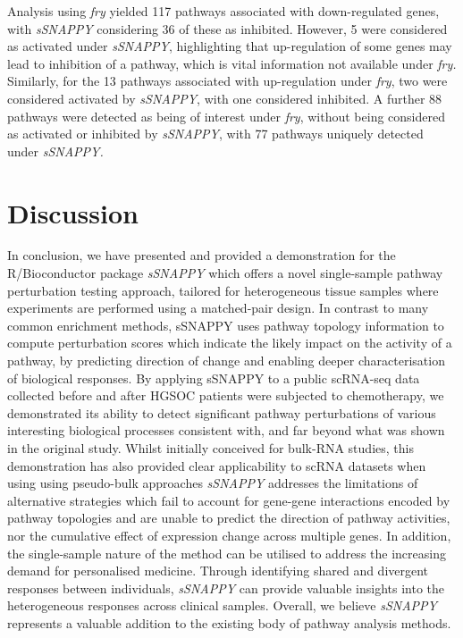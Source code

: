 \documentclass[9pt,a4paper,]{extarticle}
\begin{document}
Analysis using \emph{fry} yielded 117 pathways associated with down-regulated genes, with \emph{sSNAPPY} considering 36 of these as inhibited.
However, 5 were considered as activated under \emph{sSNAPPY}, highlighting that up-regulation of some genes may lead to inhibition of a pathway, which is vital information not available under \emph{fry.}
Similarly, for the 13 pathways associated with up-regulation under \emph{fry}, two were considered activated by \emph{sSNAPPY}, with one considered inhibited.
A further 88 pathways were detected as being of interest under \emph{fry}, without being considered as activated or inhibited by \emph{sSNAPPY}, with 77 pathways uniquely detected under \emph{sSNAPPY.}

\hypertarget{discussion}{%
\section{Discussion}\label{discussion}}

In conclusion, we have presented and provided a demonstration for the R/Bioconductor package \emph{sSNAPPY} which offers a novel single-sample pathway perturbation testing approach, tailored for heterogeneous tissue samples where experiments are performed using a matched-pair design.
In contrast to many common enrichment methods, sSNAPPY uses pathway topology information to compute perturbation scores which indicate the likely impact on the activity of a pathway, by predicting direction of change and enabling deeper characterisation of biological responses.
By applying sSNAPPY to a public scRNA-seq data collected before and after HGSOC patients were subjected to chemotherapy, we demonstrated its ability to detect significant pathway perturbations of various interesting biological processes consistent with, and far beyond what was shown in the original study.
Whilst initially conceived for bulk-RNA studies, this demonstration has also provided clear applicability to scRNA datasets when using using pseudo-bulk approaches
\emph{sSNAPPY} addresses the limitations of alternative strategies which fail to account for gene-gene interactions encoded by pathway topologies and are unable to predict the direction of pathway activities, nor the cumulative effect of expression change across multiple genes.
In addition, the single-sample nature of the method can be utilised to address the increasing demand for personalised medicine.
Through identifying shared and divergent responses between individuals, \emph{sSNAPPY} can provide valuable insights into the heterogeneous responses across clinical samples.
Overall, we believe \emph{sSNAPPY} represents a valuable addition to the existing body of pathway analysis methods.
\end{document}
